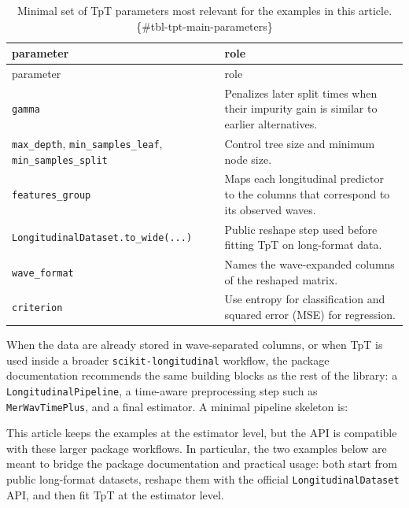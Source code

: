 \documentclass[
]{article}
\begin{document}
\begin{longtable}[]{@{}
  >{\raggedright\arraybackslash}p{}
  >{\raggedright\arraybackslash}p{}@{}}
\caption{Minimal set of TpT parameters most relevant for the examples in
this article. \{\#tbl-tpt-main-parameters\}}\tabularnewline
\toprule\noalign{}
\begin{minipage}[b]{\linewidth}\raggedright
parameter
\end{minipage} & \begin{minipage}[b]{\linewidth}\raggedright
role
\end{minipage} \\
\midrule\noalign{}
\endfirsthead
\toprule\noalign{}
\begin{minipage}[b]{\linewidth}\raggedright
parameter
\end{minipage} & \begin{minipage}[b]{\linewidth}\raggedright
role
\end{minipage} \\
\midrule\noalign{}
\endhead
\bottomrule\noalign{}
\endlastfoot
\texttt{gamma} & Penalizes later split times when their impurity gain is
similar to earlier alternatives. \\
\texttt{max\_depth}, \texttt{min\_samples\_leaf},
\texttt{min\_samples\_split} & Control tree size and minimum node
size. \\
\texttt{features\_group} & Maps each longitudinal predictor to the
columns that correspond to its observed waves. \\
\texttt{LongitudinalDataset.to\_wide(...)} & Public reshape step used
before fitting TpT on long-format data. \\
\texttt{wave\_format} & Names the wave-expanded columns of the reshaped
matrix. \\
\texttt{criterion} & Use entropy for classification and squared error
(MSE) for regression. \\
\end{longtable}

When the data are already stored in wave-separated columns, or when TpT
is used inside a broader \texttt{scikit-longitudinal} workflow, the
package documentation recommends the same building blocks as the rest of
the library: a \texttt{LongitudinalPipeline}, a time-aware preprocessing
step such as \texttt{MerWavTimePlus}, and a final estimator. A minimal
pipeline skeleton is:

This article keeps the examples at the estimator level, but the API is
compatible with these larger package workflows. In particular, the two
examples below are meant to bridge the package documentation and
practical usage: both start from public long-format datasets, reshape
them with the official \texttt{LongitudinalDataset} API, and then fit
TpT at the estimator level.
\end{document}
